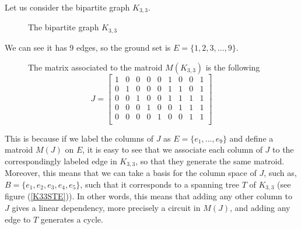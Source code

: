 \begin{exmp}
    Let us consider the bipartite graph $K_{3,3}$.
\begin{figure}[H]
\centering
{}
    \caption{The bipartite graph $K_{3,3}$}
    \label{fig:enter-label}
\end{figure}

We can see it has 9 edges, so the ground set is $E=\{1,2,3, \dots, 9\} $.

\begin{figure}[H]
The matrix associated to the matroid $M(K_{3,3})$ is the following
$$J = \begin{bmatrix}
    1 & 0 & 0 & 0 & 0 & 1 & 0 & 0 & 1\\
    0 & 1 & 0 & 0 & 0 & 1 & 1 & 0 & 1\\
    0 & 0 & 1 & 0 & 0 & 1 & 1 & 1 & 1\\
    0 & 0 & 0 & 1 & 0 & 0 & 1 & 1 & 1\\
    0 & 0 & 0 & 0 & 1 & 0 & 0 & 1 & 1\\
\end{bmatrix}$$
\end{figure}

This is because if we label the columns of $J$ as $E = \{e_1,\dots, e_9\}$ and define a matroid $M(J)$ on $E$, it is easy to see that we associate each column of $J$ to the correspondingly labeled edge in $K_{3,3}$, so that they generate the same matroid. Moreover, this means that we can take a basis for the column space of $J$, such as, $B = \{e_1, e_2, e_3, e_4, e_5\}$, such that it corresponds to a spanning tree $T$ of $K_{3,3}$ (see figure (\ref{K33STE})). In other words, this means that adding any other column to $J$ gives a linear dependency, more precisely a circuit in $M(J)$, and adding any edge to $T$ generates a cycle.


\end{exmp}
